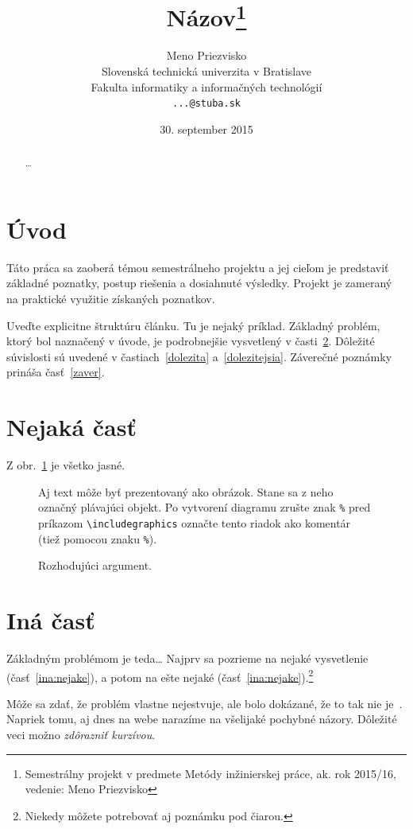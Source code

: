 \documentclass[10pt,twoside,slovak,a4paper]{coursepaper}
\title{Názov\thanks{Semestrálny projekt v predmete Metódy inžinierskej práce, ak. rok 2015/16, vedenie: Meno Priezvisko}} %
\author{Meno Priezvisko\\[2pt]
	{\small Slovenská technická univerzita v Bratislave}\\
	{\small Fakulta informatiky a informačných technológií}\\
	{\small \texttt{...@stuba.sk}}
	}
\date{\small 30. september 2015} %
\begin{document}
\maketitle

\begin{abstract}
\ldots
\end{abstract}



\section{Úvod}

Táto práca sa zaoberá témou semestrálneho projektu a jej cieľom je predstaviť základné poznatky, postup riešenia a dosiahnuté výsledky.
Projekt je zameraný na praktické využitie získaných poznatkov.

Uveďte explicitne štruktúru článku. Tu je nejaký príklad.
Základný problém, ktorý bol naznačený v úvode, je podrobnejšie vysvetlený v časti~\ref{nejaka}.
Dôležité súvislosti sú uvedené v častiach~\ref{dolezita} a~\ref{dolezitejsia}.
Záverečné poznámky prináša časť~\ref{zaver}.



\section{Nejaká časť} \label{nejaka}

Z obr.~\ref{f:rozhod} je všetko jasné. 

\begin{figure}[tbh]
\centering
Aj text môže byť prezentovaný ako obrázok. Stane sa z neho označný plávajúci objekt. Po vytvorení diagramu zrušte znak \texttt{\%} pred príkazom \verb|\includegraphics| označte tento riadok ako komentár (tiež pomocou znaku \texttt{\%}).
\caption{Rozhodujúci argument.}
\label{f:rozhod}
\end{figure}



\section{Iná časť} \label{ina}

Základným problémom je teda\ldots{} Najprv sa pozrieme na nejaké vysvetlenie (časť~\ref{ina:nejake}), a potom na ešte nejaké (časť~\ref{ina:nejake}).\footnote{Niekedy môžete potrebovať aj poznámku pod čiarou.}

Môže sa zdať, že problém vlastne nejestvuje\cite{Coplien:MPD}, ale bolo dokázané, že to tak nie je~\cite{Czarnecki:Staged, Czarnecki:Progress}. Napriek tomu, aj dnes na webe narazíme na všelijaké pochybné názory\cite{PLP-Framework}. Dôležité veci možno \emph{zdôrazniť kurzívou}.
\end{document}
